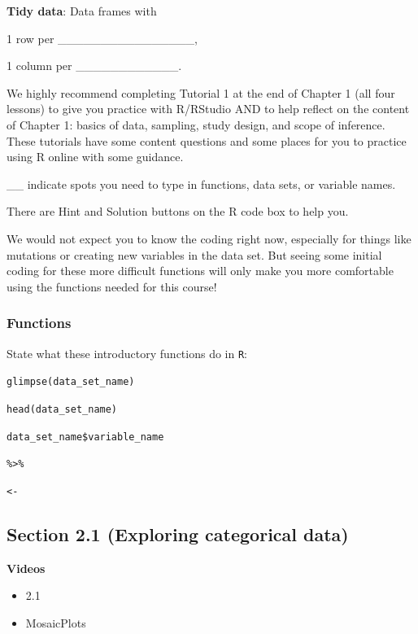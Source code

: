 \documentclass[
]{report}
\providecommand{\tightlist}{%
  \setlength{\itemsep}{0pt}\setlength{\parskip}{0pt}}
\newcommand{\rgi}{\hspace{24pt}}  %
\begin{document}
\textbf{Tidy data}: Data frames with

\rgi 1 row per \_\_\_\_\_\_\_\_\_\_\_\_\_\_\_\_,

\rgi 1 column per \_\_\_\_\_\_\_\_\_\_\_\_.

We highly recommend completing Tutorial 1 at the end of Chapter 1 (all four lessons) to give you practice with R/RStudio AND to help reflect on the content of Chapter 1: basics of data, sampling, study design, and scope of inference. These tutorials have some content questions and some places for you to practice using R online with some guidance.

\rgi \_\_ indicate spots you need to type in functions, data sets, or variable names.

\rgi There are Hint and Solution buttons on the R code box to help you.

We would not expect you to know the coding right now, especially for things like mutations or creating new variables in the data set. But seeing some initial coding for these more difficult functions will only make you more comfortable using the functions needed for this course!

\hypertarget{functions}{%
\subsubsection*{Functions}\label{functions}}

State what these introductory functions do in \texttt{R}:

\texttt{glimpse(data\_set\_name)}

\texttt{head(data\_set\_name)}

\texttt{data\_set\_name\$variable\_name}

\texttt{\%\textgreater{}\%}

\texttt{\textless{}-}

\hypertarget{section-2.1-exploring-categorical-data}{%
\subsection*{Section 2.1 (Exploring categorical data)}\label{section-2.1-exploring-categorical-data}}


\textbf{Videos}

\begin{itemize}
\tightlist
\item
  2.1
\item
  MosaicPlots
\end{itemize}
\end{document}
